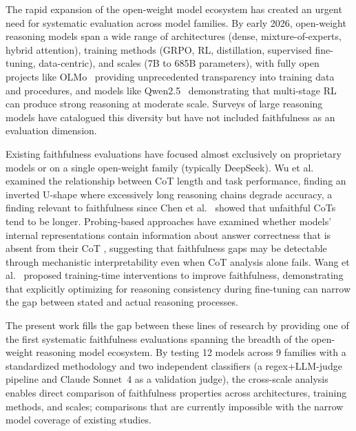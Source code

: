 The rapid expansion of the open-weight model ecosystem has created an urgent need
for systematic evaluation across model families. By early 2026, open-weight
reasoning models span a wide range of architectures (dense, mixture-of-experts,
hybrid attention), training methods (GRPO, RL, distillation, supervised
fine-tuning, data-centric), and scales (7B to 685B parameters), with fully
open projects like OLMo~\cite{groeneveld2024olmo} providing unprecedented
transparency into training data and procedures, and models like
Qwen2.5~\cite{qwen2024technical} demonstrating that multi-stage RL can produce
strong reasoning at moderate scale. Surveys of large reasoning models
\cite{xu2025large, qchen2025longcot, li2025system12} have catalogued this
diversity but have not included faithfulness as an evaluation dimension.

Existing faithfulness evaluations have focused almost exclusively on proprietary
models or on a single open-weight family (typically DeepSeek). Wu et
al.~\cite{wu2025moreless} examined the relationship between CoT length and task
performance, finding an inverted U-shape where excessively long reasoning chains
degrade accuracy, a finding relevant to faithfulness since Chen et
al.~\cite{chen2025reasoning} showed that unfaithful CoTs tend to be longer.
Probing-based approaches have examined whether models' internal representations
contain information about answer correctness that is absent from their CoT
\cite{zhang2025probing}, suggesting that faithfulness gaps may be detectable through
mechanistic interpretability even when CoT analysis alone fails. Wang et
al.~\cite{paul2024making} proposed training-time interventions to improve
faithfulness, demonstrating that explicitly optimizing for reasoning consistency
during fine-tuning can narrow the gap between stated and actual reasoning processes.

The present work fills the gap between these lines of research by providing one of the first systematic faithfulness evaluations spanning the breadth of the
open-weight reasoning model ecosystem. By testing 12 models across 9 families
with a standardized methodology and two independent classifiers (a
regex+LLM-judge pipeline and Claude Sonnet~4 as a validation judge), the
cross-scale analysis enables direct comparison of faithfulness properties
across architectures, training methods, and scales; comparisons that are
currently impossible with the narrow model coverage of existing studies.
